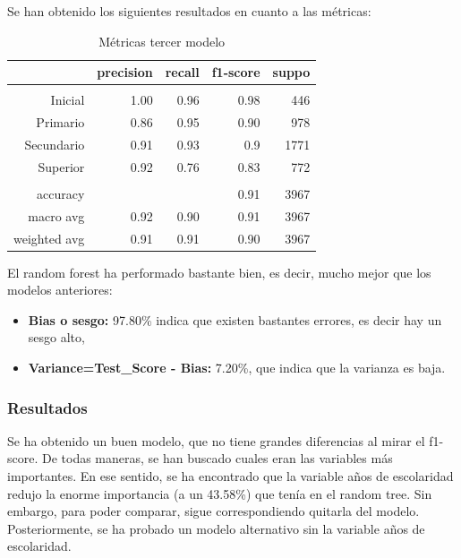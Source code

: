 \documentclass[a4paper]{article}
\begin{document}
            Se han obtenido los siguientes resultados en cuanto a las métricas:
            \begin{table}[H]
                \centering
                \begin{tabular}{rrrrr}
                    \toprule
                    ~ & precision & recall & f1-score & suppo \\ \midrule
                    & & & & \\
                    Inicial    & 1.00 & 0.96 & 0.98 & 446 \\
                    Primario   & 0.86 & 0.95 & 0.90 & 978 \\
                    Secundario & 0.91 & 0.93 & 0.9 & 1771 \\
                    Superior   & 0.92 & 0.76 & 0.83 & 772 \\
                    & & & & \\
                    accuracy & & & 0.91 & 3967 \\
                    macro avg & 0.92 & 0.90 & 0.91 & 3967 \\
                    weighted avg & 0.91 & 0.91 & 0.90 & 3967 \\
                    \bottomrule
                \end{tabular}
                \caption{Métricas tercer modelo}
                \label{Thrid model metrics}
            \end{table}

             El random forest ha performado bastante bien, es decir, mucho mejor que los modelos anteriores:
             \begin{itemize}
                \item \textbf{Bias o sesgo:} 97.80\% indica que existen bastantes errores, es decir hay un sesgo alto,
                \item \textbf{Variance=Test\_Score - Bias:} 7.20\%, que indica que la varianza es baja.
             \end{itemize}

            \subsubsection*{Resultados}

             Se ha obtenido un buen modelo, que no tiene grandes diferencias al mirar el f1-score. De todas maneras, se han buscado cuales eran las variables más importantes. En ese sentido, se ha encontrado que la variable años de escolaridad redujo la enorme importancia (a un 43.58\%) que tenía en el random tree. Sin embargo, para poder comparar, sigue correspondiendo quitarla del modelo. Posteriormente, se ha probado un modelo alternativo sin la variable años de escolaridad. 
\end{document}
